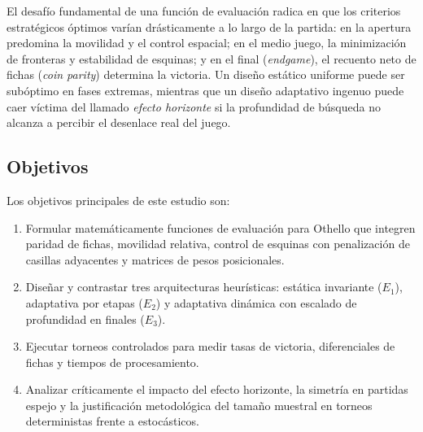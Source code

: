 \documentclass[10pt,a4paper]{article}
\begin{document}
El desafío fundamental de una función de evaluación radica en que los criterios estratégicos óptimos varían drásticamente a lo largo de la partida: en la apertura predomina la movilidad y el control espacial; en el medio juego, la minimización de fronteras y estabilidad de esquinas; y en el final (\textit{endgame}), el recuento neto de fichas (\textit{coin parity}) determina la victoria. Un diseño estático uniforme puede ser subóptimo en fases extremas, mientras que un diseño adaptativo ingenuo puede caer víctima del llamado \textit{efecto horizonte} si la profundidad de búsqueda no alcanza a percibir el desenlace real del juego.

\subsection{Objetivos}
Los objetivos principales de este estudio son:
\begin{enumerate}
    \item Formular matemáticamente funciones de evaluación para Othello que integren paridad de fichas, movilidad relativa, control de esquinas con penalización de casillas adyacentes y matrices de pesos posicionales.
    \item Diseñar y contrastar tres arquitecturas heurísticas: estática invariante ($E_1$), adaptativa por etapas ($E_2$) y adaptativa dinámica con escalado de profundidad en finales ($E_3$).
    \item Ejecutar torneos controlados para medir tasas de victoria, diferenciales de fichas y tiempos de procesamiento.
    \item Analizar críticamente el impacto del efecto horizonte, la simetría en partidas espejo y la justificación metodológica del tamaño muestral en torneos deterministas frente a estocásticos.
\end{enumerate}
\end{document}
